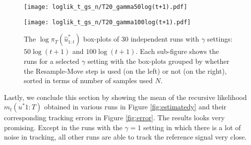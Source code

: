 \begin{figure}[!thbp]
    \centering
    \begin{minipage}{.5\textwidth}
        \centering
        \texttt{[image: loglik\_t\_gs\_n/T20\_gamma50log(t+1).pdf]}
    \end{minipage}%
    \begin{minipage}{0.5\textwidth}
        \centering
        \texttt{[image: loglik\_t\_gs\_n/T20\_gamma100log(t+1).pdf]}
    \end{minipage}
    \caption{The $\log\pi_T(\hat{u}^*_{1:t})$ box-plots of 30 independent runs with $\gamma$ settings: $50\log(t+1)$ and $100\log(t+1)$. Each sub-figure shows the runs for a selected $\gamma$ setting with the box-plots grouped by whether the Resample-Move step is used (on the left) or not (on the right), sorted in terms of number of samples used $N$.}
    \label{fig:log}
\end{figure}

Lastly, we conclude this section by showing the mean of the recursive likelihood $m_t(u^*{1:T})$ obtained in various runs in Figure \ref{fig:estimatedy} and their corresponding tracking errors in Figure \ref{fig:error}. The results looks very promising. Except in the runs with the $\gamma=1$ setting in which there is a lot of noise in tracking, all other runs are able to track the reference signal very close. 

